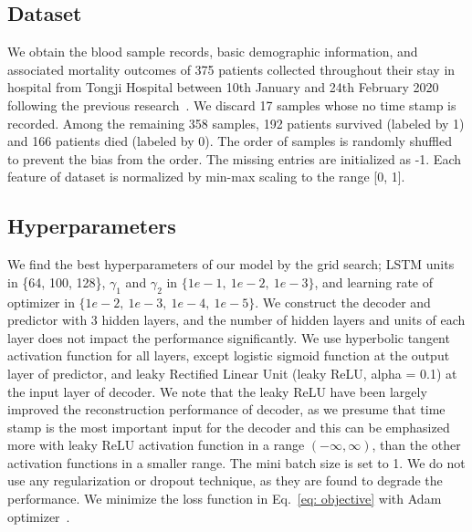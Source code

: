 \subsection{Dataset}
We obtain the blood sample records, basic demographic information, and associated mortality outcomes of 375 patients collected throughout their stay in hospital from Tongji Hospital between 10th January and 24th February 2020 following the previous research~\cite{yan2020interpretable}. We discard 17 samples whose no time stamp is recorded. Among the remaining 358 samples, 192 patients survived (labeled by 1) and 166 patients died (labeled by 0). The order of samples is randomly shuffled to prevent the bias from the order. The missing entries are initialized as -1. Each feature of dataset is normalized by min-max scaling to the range [0, 1]. 

\subsection{Hyperparameters}
We find the best hyperparameters of our model by the grid search; LSTM units in \{64, 100, 128\}, $\gamma_1$ and $\gamma_2$ in $\{1e-1,\ 1e-2,\ 1e-3\}$, and learning rate of optimizer in $\{1e-2,\ 1e-3,\ 1e-4,\ 1e-5\}$. We construct the decoder and predictor with 3 hidden layers, and the number of hidden layers and units of each layer does not impact the performance significantly. We use hyperbolic tangent activation function for all layers, except logistic sigmoid function at the output layer of predictor, and leaky Rectified Linear Unit (leaky ReLU, alpha = 0.1) at the input layer of decoder. We note that the leaky ReLU have been largely improved the reconstruction performance of decoder, as we presume that time stamp is the most important input for the decoder and this can be emphasized more with leaky ReLU activation function in a range $(- \infty, \infty)$, than the other activation functions in a smaller range. The mini batch size is set to 1. We do not use any regularization or dropout technique, as they are found to degrade the performance. We minimize the loss function in Eq.~\eqref{eq: objective} with Adam optimizer~\cite{kingma2014adam}.

